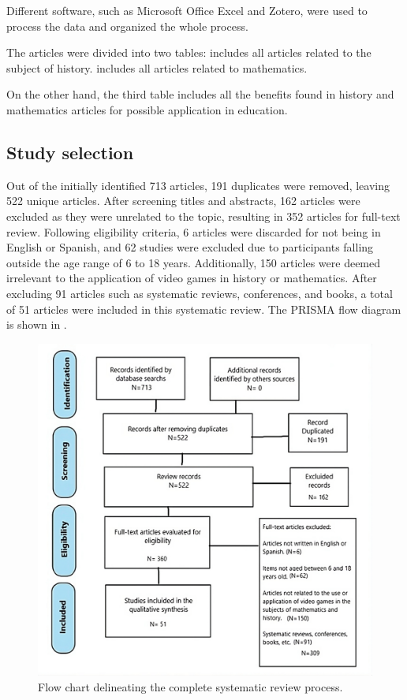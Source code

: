 \documentclass[english]{textolivre}
\begin{document}
Different software, such as Microsoft Office Excel and Zotero, were used to process the data and organized the whole process.

The articles were divided into two tables:  includes all articles related to the subject of history.  includes all articles related to mathematics.

On the other hand, the third table includes all the benefits found in history and mathematics articles for possible application in education.

\subsection{Study selection}
Out of the initially identified 713 articles, 191 duplicates were removed, leaving 522 unique articles. After screening titles and abstracts, 162 articles were excluded as they were unrelated to the topic, resulting in 352 articles for full-text review. Following eligibility criteria, 6 articles were discarded for not being in English or Spanish, and 62 studies were excluded due to participants falling outside the age range of 6 to 18 years. Additionally, 150 articles were deemed irrelevant to the application of video games in history or mathematics. After excluding 91 articles such as systematic reviews, conferences, and books, a total of 51 articles were included in this systematic review. The PRISMA flow diagram is shown in .

\begin{figure}
\centering
\begin{minipage}{.85\textwidth}
\includegraphics[width=0.85\linewidth]{Fig1_2.png}
\caption{Flow chart delineating the complete systematic review process.}
\label{fig1}
\end{minipage}
\end{figure}
\end{document}
